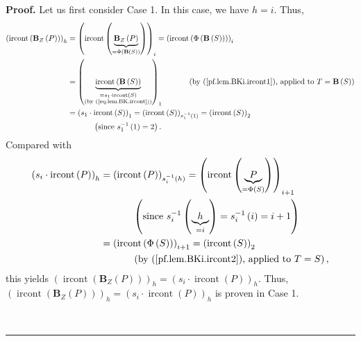 \documentclass[numbers=enddot,12pt,final,onecolumn,notitlepage]{scrartcl}%
\theoremstyle{definition}
\newenvironment{proof}[1][Proof]{\noindent\textbf{#1.} }{\ \rule{0.5em}{0.5em}}
\newenvironment{verlong}{}{}
\begin{document}
\begin{verlong}
\begin{proof}
Let us first consider Case 1. In this case, we have $h=i$. Thus,%
\begin{align*}
\left(  \operatorname*{ircont}\left(  \mathbf{B}_{Z}\left(  P\right)  \right)
\right)  _{h}  &  =\left(  \operatorname*{ircont}\left(
\underbrace{\mathbf{B}_{Z}\left(  P\right)  }_{=\Phi\left(  \mathbf{B}\left(
S\right)  \right)  }\right)  \right)  _{i}=\left(  \operatorname*{ircont}%
\left(  \Phi\left(  \mathbf{B}\left(  S\right)  \right)  \right)  \right)
_{i}\\
&  =\left(  \underbrace{\operatorname*{ircont}\left(  \mathbf{B}\left(
S\right)  \right)  }_{\substack{=s_{1}\cdot\operatorname*{ircont}\left(
S\right)  \\\text{(by (\ref{eq.lem.BK.ircont}))}}}\right)  _{1}%
\ \ \ \ \ \ \ \ \ \ \left(  \text{by (\ref{pf.lem.BKi.ircont1}), applied to
}T=\mathbf{B}\left(  S\right)  \right) \\
&  =\left(  s_{1}\cdot\operatorname*{ircont}\left(  S\right)  \right)
_{1}=\left(  \operatorname*{ircont}\left(  S\right)  \right)  _{s_{1}%
^{-1}\left(  1\right)  }=\left(  \operatorname*{ircont}\left(  S\right)
\right)  _{2}\\
&  \ \ \ \ \ \ \ \ \ \ \left(  \text{since }s_{1}^{-1}\left(  1\right)
=2\right)  .
\end{align*}
Compared with%
\begin{align*}
\left(  s_{i}\cdot\operatorname*{ircont}\left(  P\right)  \right)  _{h}  &
=\left(  \operatorname*{ircont}\left(  P\right)  \right)  _{s_{i}^{-1}\left(
h\right)  }=\left(  \operatorname*{ircont}\left(  \underbrace{P}_{=\Phi\left(
S\right)  }\right)  \right)  _{i+1}\\
&  \ \ \ \ \ \ \ \ \ \ \left(  \text{since }s_{i}^{-1}\left(  \underbrace{h}%
_{=i}\right)  =s_{i}^{-1}\left(  i\right)  =i+1\right) \\
&  =\left(  \operatorname*{ircont}\left(  \Phi\left(  S\right)  \right)
\right)  _{i+1}=\left(  \operatorname*{ircont}\left(  S\right)  \right)
_{2}\\
&  \ \ \ \ \ \ \ \ \ \ \left(  \text{by (\ref{pf.lem.BKi.ircont2}), applied to
}T=S\right)  ,
\end{align*}
this yields $\left(  \operatorname*{ircont}\left(  \mathbf{B}_{Z}\left(
P\right)  \right)  \right)  _{h}=\left(  s_{i}\cdot\operatorname*{ircont}%
\left(  P\right)  \right)  _{h}$. Thus, $\left(  \operatorname*{ircont}\left(
\mathbf{B}_{Z}\left(  P\right)  \right)  \right)  _{h}=\left(  s_{i}%
\cdot\operatorname*{ircont}\left(  P\right)  \right)  _{h}$ is proven in Case 1.


\end{proof}
\end{verlong}
\end{document}
